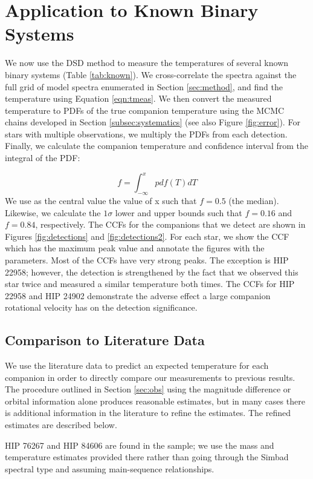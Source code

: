 \documentclass{emulateapj}
\begin{document}
\section{Application to Known Binary Systems}
\label{sec:results}

We now use the DSD method to measure the temperatures of several known binary systems (Table \ref{tab:known}). We cross-correlate the spectra against the full grid of model spectra enumerated in Section \ref{sec:method}, and find the temperature using Equation \ref{eqn:tmeas}. We then convert the measured temperature to PDFs of the true companion temperature using the MCMC chains developed in Section \ref{subsec:systematics} (see also Figure \ref{fig:error}). For stars with multiple observations, we multiply the PDFs from each detection. Finally, we calculate the companion temperature and confidence interval from the integral of the PDF:

\begin{equation}
f = \int_{-\infty}^x {pdf(T)dT}
\end{equation}
We use as the central value the value of x such that $f=0.5$ (the median). Likewise, we calculate the $1 \sigma$ lower and upper bounds such that $f = 0.16$ and $f = 0.84$, respectively. The CCFs for the companions that we detect are shown in Figures \ref{fig:detections} and \ref{fig:detections2}. For each star, we show the CCF which has the maximum peak value and annotate the figures with the parameters. Most of the CCFs have very strong peaks. The exception is HIP 22958; however, the detection is strengthened by the fact that we observed this star twice and measured a similar temperature both times. The CCFs for HIP 22958 and HIP 24902 demonstrate the adverse effect a large companion rotational velocity has on the detection significance.

\subsection{Comparison to Literature Data}
\label{subsec:expected_teffs}
We use the literature data to predict an expected temperature for each companion in order to directly compare our measurements to previous results. The procedure outlined in Section \ref{sec:obs} using the magnitude difference or orbital information alone produces reasonable estimates, but in many cases there is additional information in the literature to refine the estimates. The refined estimates are described below.

HIP 76267 and HIP 84606 are found in the \cite{David2015} sample; we use the mass and temperature estimates provided there rather than going through the Simbad spectral type and assuming main-sequence relationships.
\end{document}
